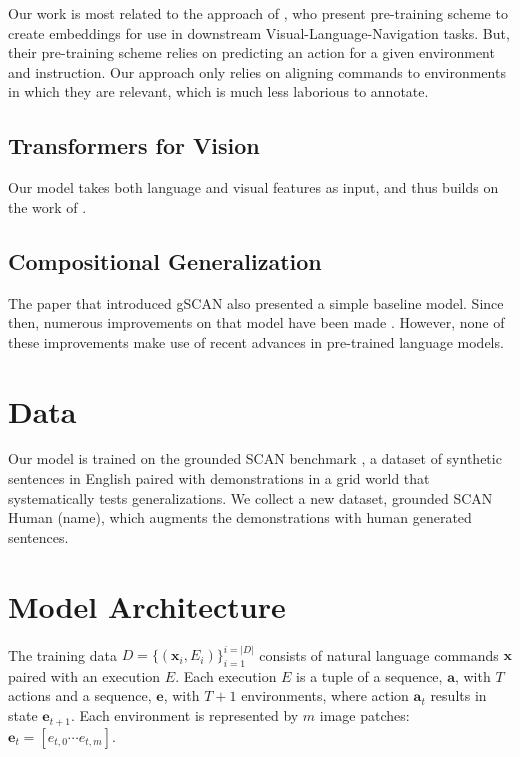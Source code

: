\documentclass[11pt]{article}
\begin{document}
%
Our work is most related to the approach of \citet{Hao2020TowardsLA}, who present pre-training scheme to create embeddings for use in downstream Visual-Language-Navigation tasks.
%
But, their pre-training scheme relies on predicting an action for a given environment and instruction.
%
Our approach only relies on aligning commands to environments in which they are relevant, which is much less laborious to annotate.
%

\subsection{Transformers for Vision}
Our model takes both language and visual features as input, and thus builds on the work of \citep{LuViLBERT2019, tan-bansal-2019-lxmert, LiVisualBert2019}.

\subsection{Compositional Generalization}
The paper \citep{ruis2020benchmark} that introduced gSCAN also presented a simple baseline model.
%
Since then, numerous improvements on that model have been made \citep{gao-etal-2020-systematic, heinze-think-2020, kuo2020compositional}.
%
However, none of these improvements make use of recent advances in pre-trained language models. 

\section{Data}
Our model is trained on the grounded SCAN benchmark \citep{ruis2020benchmark}, a dataset of synthetic sentences in English paired with demonstrations in a grid world that systematically tests generalizations.
%
We collect a new dataset, grounded SCAN Human (\TODO name), which augments the demonstrations with human generated sentences.
%


\section{Model Architecture}
The training data $D=\{(\mathbf{x}_i, E_i) \}_{i=1}^{i=|D|}$ consists of natural language commands $\mathbf{x}$ paired with an execution $E$. 
%
Each execution $E$ is a tuple of a sequence, $\mathbf{a}$, with $T$ actions and a sequence, $\mathbf{e}$, with $T+1$ environments, where action $\mathbf{a}_t$ results in state  $\mathbf{e}_{t+1}$. 
%
Each environment is represented by $m$ image patches: $\mathbf{e}_{t} = [e_{t,0}\cdots e_{t,m}]$.
%
\end{document}

